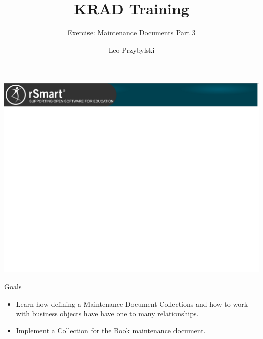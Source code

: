 \documentclass[xcolor=dvipsnames,14pt,professionalfonts]{beamer}
\begin{document}
\title{KRAD Training}
\subtitle{Exercise: Maintenance Documents Part 3}
\author[Leo]{Leo Przybylski}

\usebackgroundtemplate%
{%
    \includegraphics[width=\paperwidth,height=\paperheight]{../img/header.png}%
}

{
%
\begin{frame}[plain]
  \titlepage
\end{frame}
}

\begin{frame}{Goals}
  \begin{itemize}
 \item Learn how defining a Maintenance Document Collections and how
   to work with business objects have have one to many relationships.
 \item Implement a Collection for the Book maintenance document.
\end{itemize}
\end{frame}
\end{document}
